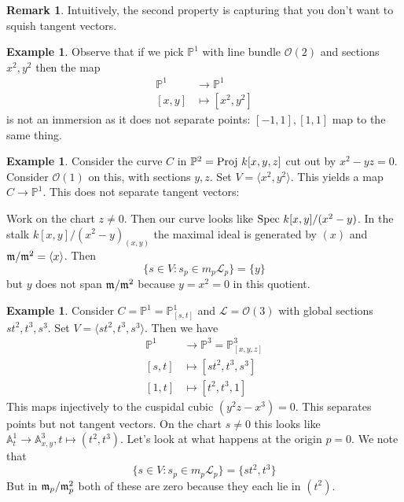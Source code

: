 \documentclass[10pt,reqno]{amsart}
\theoremstyle{definition}
\newtheorem{example}[theorem]{Example}
\newtheorem{remark}[theorem]{Remark}
\theoremstyle{remark}
\numberwithin{equation}{section}
\numberwithin{theorem}{section}
\newcommand{\OO}{{\mathcal O}}
\newcommand{\spec}{\textup{Spec }}
\newcommand{\proj}{\textup{Proj }}
\newcommand{\LL}{{\mathscr L}}
\newcommand{\mm}{\frak{m}}
\newcommand{\A}{{\mathbb A}}
\newcommand{\PP}{{\mathbb P}}
\begin{document}
\begin{remark}
Intuitively, the second property is capturing that you don't want to squish tangent vectors.
\end{remark}

\begin{example}
Observe that if we pick $\PP^1$ with line bundle $\OO(2)$ and sections $x^2,y^2$ then the map
\begin{align*}
\PP^1 &\to \PP^1\\
[x,y] &\mapsto [x^2,y^2]
\end{align*}
is not an immersion as it does not separate points: $[-1,1],[1,1]$ map to the same thing.
\end{example}

\begin{example} Consider the curve $C$ in $\PP^2 = \proj k[x,y,z]$ cut out by $x^2-yz=0$. Consider $\OO(1)$ on this, with sections $y,z$. Set $V = \langle x^2, y^2 \rangle.$ This yields a map $C \to \PP^1$. This does not separate tangent vectors:

Work on the chart $z \ne 0$. Then our curve looks like $\spec k[x,y]/(x^2-y)$. In the stalk $k[x,y]/(x^2-y)_{(x,y)}$ the maximal ideal is generated by $(x)$ and $\mm/\mm^2 = \langle x \rangle$. Then 
\[\{s \in V: s_p \in m_p \LL_p \} = \{y\}\]
but $y$ does not span $\mm/\mm^2$ because $y = x^2 = 0$ in this quotient.
\end{example}

\begin{example} Consider $C = \PP^1 = \PP^1_{[s,t]}$ and $\LL = \OO(3)$ with global sections $st^2,t^3,s^3$. Set $V = \langle st^2,t^3,s^3 \rangle$. Then we have
\begin{align*}
\PP^1 &\to \PP^3 = \PP^3_{[x,y,z]}\\
[s,t] &\mapsto [st^2,t^3, s^3]\\
[1,t] &\mapsto [t^2,t^3,1]
\end{align*}
This maps injectively to the cuspidal cubic $(y^2z - x^3) = 0$. This separates points but not tangent vectors. On the chart $s \ne 0$ this looks like $\A^1_t \to \A^3_{x,y}, t \mapsto (t^2,t^3)$. Let's look at what happens at the origin $p=0$. We note that 
\[\{s \in V: s_p \in m_p \LL_p \} = \{st^2, t^3\}\]
But in $\mm_p/\mm_p^2$ both of these are zero because they each lie in $(t^2)$.
\end{example}
\end{document}
